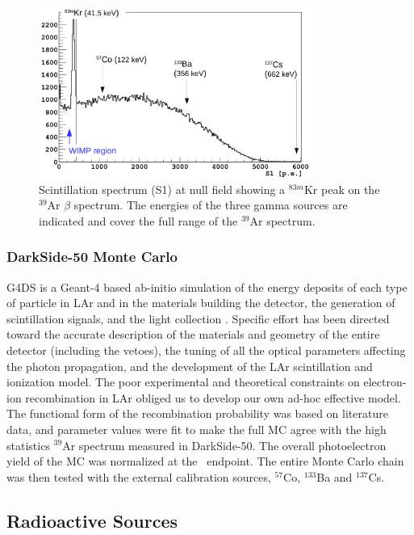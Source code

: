 \begin{figure}[htbp]
 \centering
 \includegraphics[width=0.8\textwidth]{Figures/GammaSources_Ar39spectrum.png}
 \caption{Scintillation spectrum (S1) at null field showing a $^{83m}$Kr peak on the $^{39}$Ar $\beta$ spectrum. The energies of the three gamma sources are indicated and cover the full range of the $^{39}$Ar spectrum.
\label{fig:GammaSources_Ar39spectrum}}
\end{figure}

\subsubsection*{DarkSide-50 Monte Carlo}
G4DS is a Geant-4 based ab-initio simulation of the energy deposits of each type of particle in LAr and in the materials building the detector, the generation of scintillation signals, and the light collection \cite{DS50:G4DS:paper}. Specific effort has been directed toward the accurate description of the materials and geometry of the entire detector (including the vetoes), the tuning of all the optical parameters affecting the photon propagation, and  the development of the LAr scintillation and ionization model. 
The poor experimental and theoretical constraints on electron-ion recombination in LAr obliged us to develop our own ad-hoc effective model. The functional form of the recombination probability was based on literature data, and parameter values were fit to make the full MC agree with the high statistics $^{39}$Ar spectrum measured in DarkSide-50. The overall photoelectron yield of the MC was normalized at the \ar\ endpoint. The entire Monte Carlo chain was then tested with the external calibration sources, $^{57}$Co, $^{133}$Ba and $^{137}$Cs. 


\subsection{Radioactive Sources}

